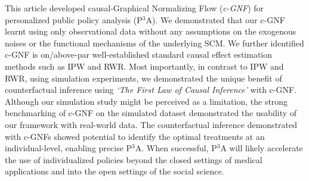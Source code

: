 \documentclass[letterpaper]{article} %
\begin{document}
This article developed causal-Graphical Normalizing Flow (\emph{c-GNF}) for personalized public policy analysis (P$^3$A). We demonstrated that our c-GNF learnt using only observational data without any assumptions on the exogenous noises or the functional mechanisms of the underlying SCM.%
We further identified c-GNF is on/above-par well-established standard causal effect estimation methods such as IPW and RWR.
Most importantly, in contrast to IPW and RWR, using simulation experiments, we demonstrated the unique benefit of counterfactual inference using \emph{`The First Law of Causal Inference'} with c-GNF. Although our simulation study might be perceived as a limitation, the strong benchmarking of c-GNF on the simulated dataset demonstrated the usability of our framework with real-world data. 
The counterfactual inference demonstrated with c-GNFs showed potential to identify the optimal treatments at an individual-level, enabling precise P$^3$A. When successful, P$^3$A will likely accelerate the use of individualized policies beyond the closed settings of medical applications and into the open settings of the social science. 



\end{document}
